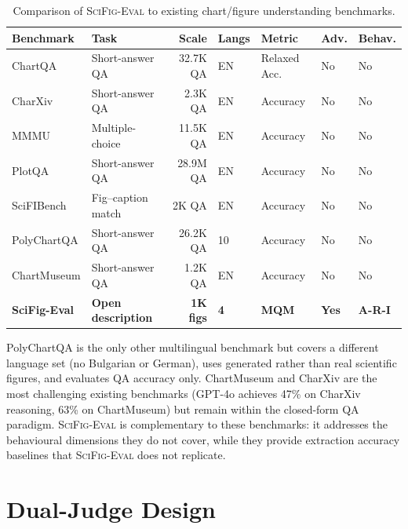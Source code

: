 \begin{table}[H]
\centering
\scriptsize
\caption{Comparison of \textsc{SciFig-Eval} to existing chart/figure understanding benchmarks.}\label{tab:benchmark-comparison}
\setlength{\tabcolsep}{2pt}
\begin{tabular}{@{}l l r l l l l@{}}
\toprule
\textbf{Benchmark} & \textbf{Task} & \textbf{Scale} & \textbf{Langs} & \textbf{Metric} & \textbf{Adv.} & \textbf{Behav.} \\
\midrule
ChartQA        & Short-answer QA   & 32.7K QA   & EN    & Relaxed Acc. & No  & No \\
CharXiv        & Short-answer QA   & 2.3K QA    & EN    & Accuracy     & No  & No \\
MMMU           & Multiple-choice   & 11.5K QA   & EN    & Accuracy     & No  & No \\
PlotQA         & Short-answer QA   & 28.9M QA   & EN    & Accuracy     & No  & No \\
SciFIBench     & Fig--caption match & 2K QA     & EN    & Accuracy     & No  & No \\
PolyChartQA    & Short-answer QA   & 26.2K QA   & 10    & Accuracy     & No  & No \\
ChartMuseum    & Short-answer QA   & 1.2K QA    & EN    & Accuracy     & No  & No \\
\midrule
\textbf{SciFig-Eval} & \textbf{Open description} & \textbf{1K figs} & \textbf{4} & \textbf{MQM} & \textbf{Yes} & \textbf{A-R-I} \\
\bottomrule
\end{tabular}
\end{table}

\noindent PolyChartQA is the only other multilingual benchmark but covers a different language set (no Bulgarian or German), uses generated rather than real scientific figures, and evaluates QA accuracy only.
ChartMuseum and CharXiv are the most challenging existing benchmarks (GPT-4o achieves 47\% on CharXiv reasoning, 63\% on ChartMuseum) but remain within the closed-form QA paradigm.
\textsc{SciFig-Eval} is complementary to these benchmarks: it addresses the behavioural dimensions they do not cover, while they provide extraction accuracy baselines that \textsc{SciFig-Eval} does not replicate.

\section{Dual-Judge Design}

